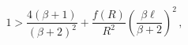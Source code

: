 \begin{equation}1>\frac{4(\beta+1)}{(\beta+2)^2}+
\frac{f(R)}{R^2}\left(\frac{\beta\ell}{\beta+2}\right)^2\,,\end{equation}

